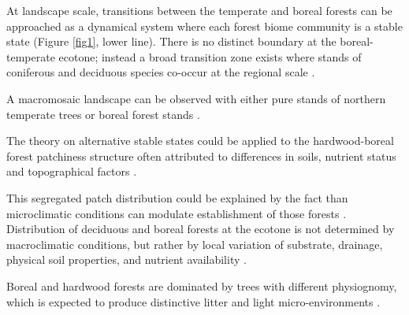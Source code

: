 At landscape scale, transitions
between  the temperate and boreal forests can be approached as a dynamical
system where each forest biome community is a stable state (Figure \ref{fig1},
lower line). There is no distinct boundary at the boreal-temperate ecotone;
instead a broad transition zone exists where stands of coniferous and
deciduous species co-occur at the regional scale
\cite{Goldblum2010,Fisichelli2013}. 


A macromosaic landscape can be observed
with either pure stands of northern temperate trees or boreal forest stands
\cite{Goldblum2010,Fisichelli2013}. 


The theory on alternative stable
states could be applied to the hardwood-boreal forest patchiness structure
often attributed to differences in soils, nutrient status and topographical
factors \cite{Society2014}. 


This segregated patch distribution could be
explained by the fact than microclimatic conditions can modulate establishment
of those forests \cite{DeFrenne2013}. Distribution of deciduous and boreal
forests at the ecotone is not determined by macroclimatic conditions, but
rather by local variation of substrate, drainage, physical soil properties,
and nutrient availability \cite{Goldblum2010,Society2014}. 


Boreal and hardwood
forests are dominated by trees with different physiognomy, which is expected
to produce distinctive litter and light micro-environments \cite{Barras1998}.


